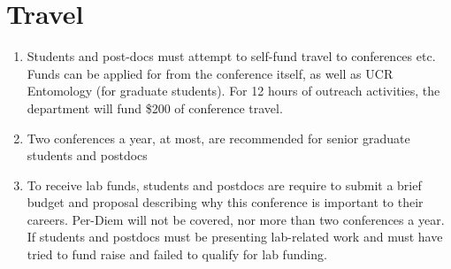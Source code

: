 \documentclass[12pt]{article}
\begin{document}
\section{Travel}
\begin{enumerate}
\item Students and post-docs must attempt to self-fund travel to
  conferences etc. Funds can be applied for from the conference
  itself, as well as UCR Entomology (for graduate students). For 12
  hours of outreach activities, the department will fund \$200 of
  conference travel. 
\item Two conferences a year, at most, are recommended
  for senior graduate students and postdocs
\item To receive lab funds, students and postdocs are require to
  submit a brief budget and proposal describing why this conference is
  important to their careers. Per-Diem will not be covered, nor more
  than two conferences a year. If students and postdocs must be
  presenting lab-related work and must have tried to fund raise and
  failed to qualify for lab funding.
\end{enumerate}
\end{document}
